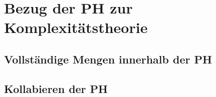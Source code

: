 \chapter{Bezug der PH zur Komplexitätstheorie} \label{chapter: Bezug der PH zur Komplexitätstheorie}

\section{Vollständige Mengen innerhalb der PH} \label{section: Vollständige Mengen innerhalb der PH}

\section{Kollabieren der PH} \label{section: Kollabieren der PH}